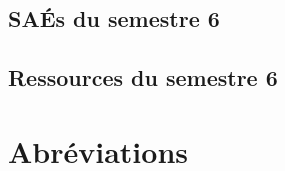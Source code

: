 \documentclass[10pt,french]{article} %
\begin{document}
\subsection{SAÉs du semestre 6}


\subsection{Ressources du semestre 6}


\newpage


\section{Abréviations}

\begin{multicols}{2}\small

\end{multicols}
\end{document}
